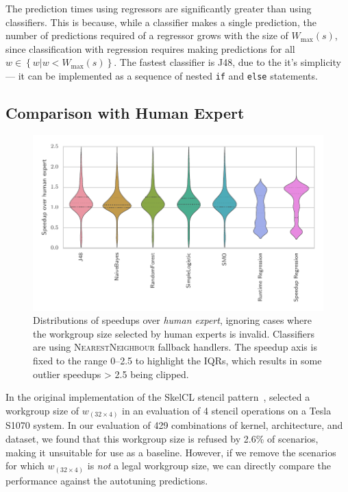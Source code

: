 \documentclass[preprint,nonatbib,10pt]{sigplanconf}
\begin{document}
The prediction times using regressors are significantly greater than
using classifiers. This is because, while a classifier makes a single
prediction, the number of predictions required of a regressor grows
with the size of $W_{\max}(s)$, since classification with regression
requires making predictions for all
$w \in \left\{ w | w < W_{\max}(s) \right\}$. The fastest classifier
is J48, due to the it's simplicity --- it can be implemented as a
sequence of nested \texttt{if} and \texttt{else} statements.


\subsection{Comparison with Human Expert}

\begin{figure}
\centering
\includegraphics[width=\columnwidth]{img/speedup-distributions}
\caption[Speedup results over human expert]{%
  Distributions of speedups over \emph{human expert}, ignoring cases
  where the workgroup size selected by human experts is
  invalid. Classifiers are using \textsc{NearestNeighbour} fallback
  handlers. The speedup axis is fixed to the range 0--2.5 to highlight
  the IQRs, which results in some outlier speedups > 2.5 being
  clipped.%
}
\label{fig:speedup-distributions}
\end{figure}

In the original implementation of the SkelCL stencil
pattern~\cite{Breuer2014a}, \citeauthor{Breuer2014a} selected a
workgroup size of $w_{(32 \times 4)}$ in an evaluation of 4 stencil
operations on a Tesla S1070 system. In our evaluation of 429
combinations of kernel, architecture, and dataset, we found that this
workgroup size is refused by 2.6\% of scenarios, making it unsuitable
for use as a baseline. However, if we remove the scenarios for which
$w_{(32 \times 4)}$ is \emph{not} a legal workgroup size, we can
directly compare the performance against the autotuning predictions.
\end{document}
